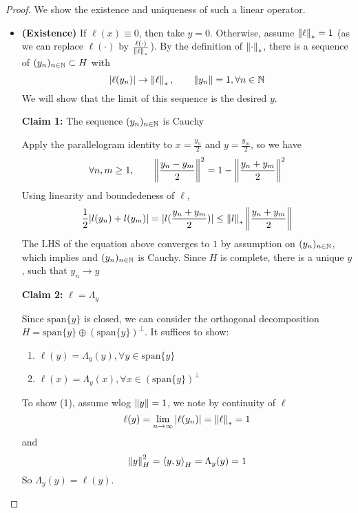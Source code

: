 \documentclass{article}
\begin{document}
\begin{proof}
    We show the existence and uniqueness of such a linear operator.  
    \begin{itemize}
        \item \textbf{(Existence)} If  \(\ell(x)\equiv 0\), then take  \(y=0\). Otherwise, assume  \(\left\|{\ell}\right\|_*=1\) (as we can replace  \(\ell(\cdot)\) by  \(\frac{\ell(\cdot)}{\left\|{\ell}\right\|_*}\)).  
        By the definition of  \(\left\|{\cdot}\right\|_*\), there is a sequence of  \((y_n)_{n\in \mathbb{N}} \subset H\) with  
        \begin{equation*}
            |\ell(y_n)| \to \left\|{\ell}\right\|_*, \qquad \left\|{y_n}\right\|=1, \forall n \in \mathbb{N}
        \end{equation*}
        We will show that the limit of this sequence is the desired  \(y\).  
        
        \textbf{Claim 1:} The sequence  \((y_n)_{n \in \mathbb{N}}\) is Cauchy   
        
        Apply the parallelogram identity to  \(x = \frac{y_n}{2}\) and  \(y = \frac{y_m}{2}\), so we have  
        \begin{equation*}
            \forall n,m \geq 1, \qquad \left\|{\frac{y_n-y_m}{2}}\right\|^2=1-\left\|{\frac{y_n+y_m}{2}}\right\|^2
        \end{equation*}  
        Using linearity and boundedeness of  \(\ell\),   
        \begin{equation*}
            \frac{1}{2} |l(y_n)+l(y_m)| = |l(\frac{y_n+y_m}{2})| \leq \left\|{l}\right\|_* \left\|{\frac{y_n+y_m}{2}}\right\|
        \end{equation*}  
        The LHS of the equation above converges to  \(1\) by assumption on  \((y_n)_{n \in \mathbb{N}}\), which implies and  \((y_n)_{n \in \mathbb{N}}\) is Cauchy.  
        Since  \(H\) is complete, there is a unique  \(y\), such that  \(y_n \to y\)  
        
        \textbf{Claim 2:}  \(\ell=\Lambda_y\)  
        
        Since  \(\textrm{span}\{y\}\) is closed, we can consider the orthogonal decomposition  \(H = \textrm{span}\{y\} \oplus (\textrm{span}\{y\})^{\perp}\).  
        It suffices to show:  
        \begin{enumerate}[(1)]
            \item  \(\ell(y)=\Lambda_y(y), \forall y \in \textrm{span}\{y\}\)
            \item  \(\ell(x)=\Lambda_y(x), \forall x \in (\textrm{span}\{y\})^{\perp}\)
        \end{enumerate}  
        To show (1), assume wlog  \(\left\|{y}\right\|=1\), we note by continuity of  \(\ell\)  
        \begin{equation*}
            \ell(y) = \lim_{n \to \infty} |\ell(y_n)| = \left\|{\ell}\right\|_*=1
        \end{equation*}  
        and 
        \begin{equation*}
            \left\|{y}\right\|^2_H = \left<{y},{y}\right>_H =\Lambda_y(y)=1
        \end{equation*}  
        So  \(\Lambda_y(y)=\ell(y)\).  
        

\end{itemize}
\end{proof}
\end{document}
